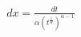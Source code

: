 \documentclass[preview]{standalone}
\begin{document}
\begin{align*}
dx = \frac{dt}{\alpha (t^{\frac{1}{\alpha}})^{\alpha - 1}}
\end{align*}
\end{document}
